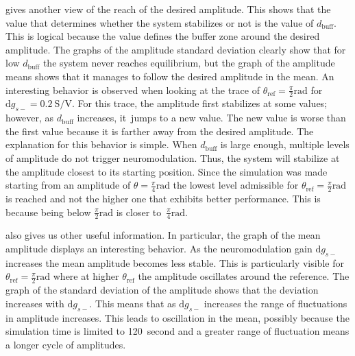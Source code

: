  gives another view of the reach of the desired amplitude.
This shows that the value that determines whether the system stabilizes or not is the value of $d_\text{buff}$.
This is logical because the value defines the buffer zone around the desired amplitude.
The graphs of the amplitude standard deviation clearly show that for low $d_\text{buff}$ the system never reaches equilibrium, but the graph of the amplitude means shows that it manages to follow the desired amplitude in the mean.
An interesting behavior is observed when looking at the trace of $\theta_\text{ref} = \frac{\pi}{2}\unit{\radian}$ for $\mathrm{d}g_{s-} = \qty{0.2}{\siemens\per\volt}$.
For this trace, the amplitude first stabilizes at some values; however, as $d_\text{buff}$ increases, it jumps to a new value.
The new value is worse than the first value because it is farther away from the desired amplitude.
The explanation for this behavior is simple.
When $d_\text{buff}$ is large enough, multiple levels of amplitude do not trigger neuromodulation. Thus, the system will stabilize at the amplitude closest to its starting position.
Since the simulation was made starting from an amplitude of $\theta = \frac{\pi}{4}\unit{\radian}$ the lowest level admissible for $\theta_\text{ref} = \frac{\pi}{2}\unit{\radian}$ is reached and not the higher one that exhibits better performance.
This is because being below $\frac{\pi}{2}\unit{\radian}$ is closer to $\frac{\pi}{4}\unit{\radian}$.

 also gives us other useful information.
In particular, the graph of the mean amplitude displays an interesting behavior.
As the neuromodulation gain $\mathrm{d}g_{s-}$ increases the mean amplitude becomes less stable.
This is particularly visible for $\theta_\text{ref}=\frac{\pi}{2}\unit{\radian}$ where at higher $\theta_\text{ref}$ the amplitude oscillates around the reference.
The graph of the standard deviation of the amplitude shows that the deviation increases with $\mathrm{d}g_{s-}$.
This means that as $\mathrm{d}g_{s-}$ increases the range of fluctuations in amplitude increases.
This leads to oscillation in the mean, possibly because the simulation time is limited to \qty{120}{second} and a greater range of fluctuation means a longer cycle of amplitudes.


